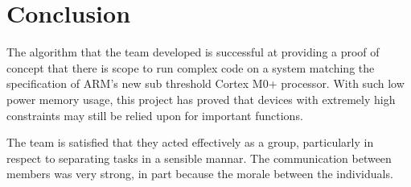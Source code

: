 \chapter{Conclusion}

The algorithm that the team developed is successful at providing a proof of concept that there is scope to run complex code on a system matching the specification of ARM's new sub threshold Cortex M0+ processor. With such low power memory usage, this project has proved that devices with extremely high constraints may still be relied upon for important functions.

The team is satisfied that they acted effectively as a group, particularly in respect to separating tasks in a sensible mannar. The communication between members was very strong, in part because the morale between the individuals. 